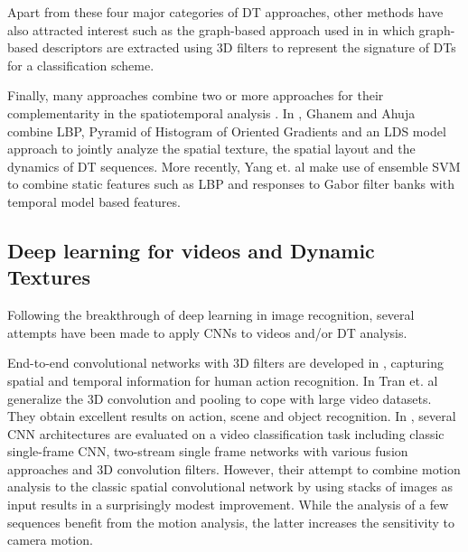 \documentclass[a4paper,11pt]{article}
\begin{document}
Apart from these four major categories of DT approaches, other methods have also attracted interest such as the graph-based approach used in \cite{ramirez2015spatiotemporal} in which graph-based descriptors are extracted using 3D filters to represent the signature of DTs for a classification scheme.

Finally, many approaches combine two or more approaches for their complementarity in the spatiotemporal analysis \cite{chen2013automatic,yang2016dynamic,peteri2005dynamic,andrearczyk2015dynamic,gao2008extended}.
In \cite{ghanem2010maximum}, Ghanem and Ahuja combine LBP, Pyramid of Histogram of Oriented Gradients and an LDS model approach to jointly analyze the spatial texture, the spatial layout and the dynamics of DT sequences.
More recently, Yang et. al \cite{yang2016dynamic} make use of ensemble SVM to combine static features such as LBP and responses to Gabor filter banks with temporal model based features.

\subsection{Deep learning for videos and Dynamic Textures}
Following the breakthrough of deep learning in image recognition, several attempts have been made to apply CNNs to videos and/or DT analysis.

End-to-end convolutional networks with 3D filters are developed in \cite{ji20133d}, capturing spatial and temporal information for human action recognition.
In \cite{tran2014learning} Tran et. al generalize the 3D convolution and pooling to cope with large video datasets.
They obtain excellent results on action, scene and object recognition.
In \cite{karpathy2014large}, several CNN architectures are evaluated on a video classification task including classic single-frame CNN, two-stream single frame networks with various fusion approaches and 3D convolution filters.
However, their attempt to combine motion analysis to the classic spatial convolutional network by using stacks of images as input results in a surprisingly modest improvement.
While the analysis of a few sequences benefit from the motion analysis, the latter increases the sensitivity to camera motion.
\end{document}
